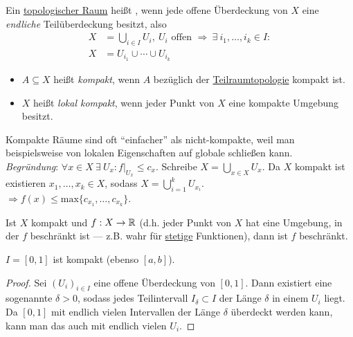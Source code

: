 \begin{definition}
  \label{def:kompakt}
  Ein \hyperref[def:topologie]{topologischer Raum} heißt , wenn jede offene Überdeckung von $ X $ eine \emph{endliche} Teilüberdeckung besitzt, also
  \begin{align*}
    X &= \bigcup_{i \in I} U_i, \ U_i \text{ offen } \Rightarrow \ \exists \ i_1, \dots, i_k \in I : \\
    X &= U_{i_1} \cup \cdots \cup U_{i_k}
  \end{align*}
  \begin{itemize}
    \item $ A \subseteq X $ heißt \emph{kompakt}, wenn $ A $ bezüglich der \hyperref[def:teilraumtopologie]{Teilraumtopologie} kompakt ist.
    \item $ X $ heißt \emph{lokal kompakt}, wenn jeder Punkt von $ X $ eine kompakte Umgebung besitzt.
  \end{itemize}
\end{definition}

\begin{remark}
  Kompakte Räume sind oft ``einfacher'' als nicht-kompakte, weil man beispielsweise von lokalen Eigenschaften auf globale schließen kann. \\
  \emph{Begründung}: $ \forall x \in X \ \exists \ U_x : f\vert_{U_x} \leq c_x $. Schreibe $ X = \bigcup_{x \in X}U_x $. Da $ X $ kompakt ist existieren $ x_1, \dots, x_k \in X $, sodass $ X = \bigcup_{i=1}^k U_{x_i} $. \\
  $ \Rightarrow f(x) \leq \text{max}\{ c_{x_1}, \dots, c_{x_k} \} $.
\end{remark}

\begin{example}
  \label{bsp:beschraenkt}
  Ist $ X $ kompakt und $ f: X \to \mathbb{R} $  (d.h. jeder Punkt von $ X $ hat eine Umgebung, in der $ f $ beschränkt ist --- z.B. wahr für \hyperref[def:stetig]{stetige} Funktionen), dann ist $ f $ beschränkt.
\end{example}

\begin{example}
  $ I = [0,1] $ ist kompakt (ebenso $ [a,b] $).
  \begin{proof}
    Sei $ (U_i)_{i \in I} $ eine offene Überdeckung von $ [0,1] $. Dann existiert eine sogenannte \label{def:lebesgueZahl} $ \delta > 0 $, sodass jedes Teilintervall $ I_\delta \subset I $ der Länge $ \delta $ in einem $ U_i $ liegt. Da $ [0,1] $ mit endlich vielen Intervallen der Länge $ \delta $ überdeckt werden kann, kann man das auch mit endlich vielen $ U_i $.
  \end{proof}
\end{example}

